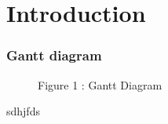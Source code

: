 \documentclass[12pt]{article}
\begin{document}
\section{Introduction}	


\subsubsection{Gantt diagram}
\clearpage

\thispagestyle{empty}
\begin{figure}[htb]
\begin{center}
\end{center}
\end{figure}
\clearpage

\thispagestyle{empty}
\begin{sidewaysfigure}[htb]
\begin{center}
\caption*{\newline \newline \newline \newline Figure 1 : Gantt Diagram}
\label{fig:ref}
\end{center}
\end{sidewaysfigure}
\clearpage









\clearpage
sdhjfds
\end{document}
